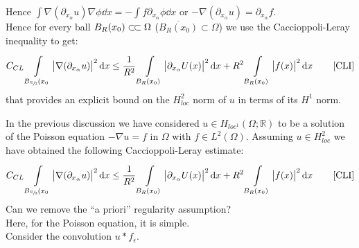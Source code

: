 Hence \( \int \nabla (\partial_{x_{\alpha }}u) \nabla \phi  \dd{x} = -\int f \partial_{x_{\alpha }}\phi  \dd{x} \) or \( -\nabla (\partial_{x_{\alpha }}u) = \partial_{x_{\alpha}}f \).\\
Hence for every ball \( B_{R} (x_{0}) \ssubset \Omega  \) (\( \overline{B_{R} (x_{0})} \subset \Omega  \)) we use the Caccioppoli-Leray inequality to get:
\begin{gather}
    C_{CL} \int\limits_{B_{\sfrac{R}{2}}(x_{0}}^{} \abs{\nabla (\partial_{x_{\alpha }}u) }^{2} \dd{x} \leq \frac{1}{R^{2}} \int\limits_{B_{R}(x_{0})}^{} \abs{\partial_{x_{\alpha }}U(x) }^{2} \dd{x} + R^{2} \int\limits_{B_{R}(x_{0})}^{} \abs{f(x) }^{2} \dd{x} \qquad \text{\eqref{CLI}}
\end{gather}
that provides an explicit bound on the \( H_{loc}^{2} \) norm of \( u \) in terms of its \( H^{1} \) norm.\\
\par
In the previous discussion we have considered \( u \in H_{loc^{1}}(\Omega ; \mathbb{R})  \) to be a solution of the Poisson equation \( -\nabla u = f \) in \( \Omega  \) with \( f \in L^{2}(\Omega ) \). Assuming \( u\in H_{loc}^{2} \) we have obtained the following Caccioppoli-Leray estimate:
\begin{gather}
    C_{CL} \int\limits_{B_{\sfrac{R}{2}}(x_{0}}^{} \abs{\nabla (\partial_{x_{\alpha }}u) }^{2} \dd{x} \leq \frac{1}{R^{2}} \int\limits_{B_{R}(x_{0})}^{} \abs{\partial_{x_{\alpha }}U(x) }^{2} \dd{x} + R^{2} \int\limits_{B_{R}(x_{0})}^{} \abs{f(x) }^{2} \dd{x} \qquad \text{\eqref{CLI}}
\end{gather}
Can we remove the \enquote{a priori} regularity assumption?\\
Here, for the Poisson equation, it is simple.\\
Consider the convolution \( u \ast f_{\epsilon } \).
